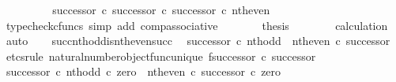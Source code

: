 \begin{isabellebody}
\ \ \ \ \isamarkupfalse%
\ \isamarkupfalse%
\ {\isachardoublequoteopen}{\isachardot}{\kern0pt}{\isachardot}{\kern0pt}{\isachardot}{\kern0pt}\ {\isacharequal}{\kern0pt}\ {\isacharparenleft}{\kern0pt}successor\ {\isasymcirc}\isactrlsub c\ successor{\isacharparenright}{\kern0pt}\ {\isasymcirc}\isactrlsub c\ successor\ {\isasymcirc}\isactrlsub c\ nth{\isacharunderscore}{\kern0pt}even{\isachardoublequoteclose}\isanewline
\ \ \ \ \ \ \isamarkupfalse%
\ {\isacharparenleft}{\kern0pt}typecheck{\isacharunderscore}{\kern0pt}cfuncs{\isacharcomma}{\kern0pt}\ simp\ add{\isacharcolon}{\kern0pt}\ comp{\isacharunderscore}{\kern0pt}associative{}{\isacharparenright}{\kern0pt}\isanewline
\ \ \ \ \isamarkupfalse%
\ \isamarkupfalse%
\ {\isacharquery}{\kern0pt}thesis\isanewline
\ \ \ \ \ \ \isamarkupfalse%
\ calculation\ \isamarkupfalse%
\ auto\isanewline
\ \ \isamarkupfalse%
\isanewline
{}\isamarkupfalse%
%
\endisatagproof
{\isafoldproof}%
%
\isadelimproof
\isanewline
%
\endisadelimproof
\isanewline
{}\isamarkupfalse%
\ succ{\isacharunderscore}{\kern0pt}nth{\isacharunderscore}{\kern0pt}odd{\isacharunderscore}{\kern0pt}is{\isacharunderscore}{\kern0pt}nth{\isacharunderscore}{\kern0pt}even{\isacharunderscore}{\kern0pt}succ{\isacharcolon}{\kern0pt}\isanewline
\ \ {\isachardoublequoteopen}successor\ {\isasymcirc}\isactrlsub c\ nth{\isacharunderscore}{\kern0pt}odd\ {\isacharequal}{\kern0pt}\ nth{\isacharunderscore}{\kern0pt}even\ {\isasymcirc}\isactrlsub c\ successor{\isachardoublequoteclose}\isanewline
%
\isadelimproof
%
\endisadelimproof
%
\isatagproof
{}\isamarkupfalse%
\ {\isacharparenleft}{\kern0pt}etcs{\isacharunderscore}{\kern0pt}rule\ natural{\isacharunderscore}{\kern0pt}number{\isacharunderscore}{\kern0pt}object{\isacharunderscore}{\kern0pt}func{\isacharunderscore}{\kern0pt}unique{\isacharbrackleft}{\kern0pt}\ f{\isacharequal}{\kern0pt}{\isachardoublequoteopen}successor\ {\isasymcirc}\isactrlsub c\ successor{\isachardoublequoteclose}{\isacharbrackright}{\kern0pt}{\isacharparenright}{\kern0pt}\isanewline
\isanewline
\ \ \isamarkupfalse%
\ {\isachardoublequoteopen}{\isacharparenleft}{\kern0pt}successor\ {\isasymcirc}\isactrlsub c\ nth{\isacharunderscore}{\kern0pt}odd{\isacharparenright}{\kern0pt}\ {\isasymcirc}\isactrlsub c\ zero\ {\isacharequal}{\kern0pt}\ {\isacharparenleft}{\kern0pt}nth{\isacharunderscore}{\kern0pt}even\ {\isasymcirc}\isactrlsub c\ successor{\isacharparenright}{\kern0pt}\ {\isasymcirc}\isactrlsub c\ zero{\isachardoublequoteclose}\isanewline

\end{isabellebody}
